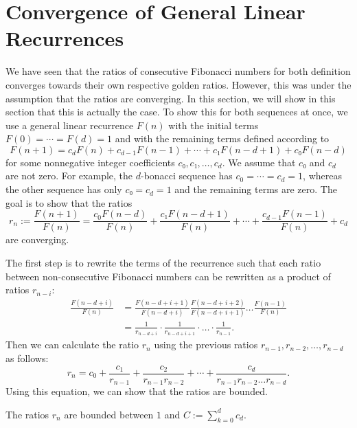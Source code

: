 \section{Convergence of General Linear Recurrences}
\label{sec:fib-conv}


We have seen that the ratios of consecutive Fibonacci numbers for both
definition converges towards their own respective golden ratios.
However, this was under the assumption that the ratios are converging.
In this section, we will show in this section that this is actually the case.
To show this for both sequences at once, we use a general linear recurrence $F(n)$
with the initial terms $F(0) = ⋯ = F(d) = 1$ and with the remaining terms
defined according to
\[
  F(n + 1) = c_d F(n) + c_{d-1} F(n-1) + ⋯ + c₁ F(n - d + 1) + c₀ F(n - d)
\]
for some nonnegative integer coefficients $c₀, c₁, …, c_d$.
We assume that $c₀$ and $c_d$ are not zero.
For example, the $d$-bonacci sequence has $c_0 = ⋯ = c_d = 1$,
whereas the other sequence has only $c₀ = c_d = 1$ and the remaining terms are zero.
The goal is to show that the ratios
\[
  r_n
  := \frac{F(n+1)}{F(n)}
  = \frac{c_0 F(n - d)}{F(n)} + \frac{c₁ F(n - d + 1)}{F(n)} + ⋯ + \frac{c_{d-1} F(n-1)}{F(n)} + c_d
\]
are converging.

The first step is to rewrite the terms of the recurrence such that each ratio
between non-consecutive Fibonacci numbers can be rewritten as a product of
ratios $r_{n-i}$:
\begin{align*}
  \frac{F(n - d + i)}{F(n)}
  & = \frac{F(n - d + i + 1)}{F(n - d + i)} \frac{F(n - d + i + 2)}{F(n - d + i + 1)} \dots \frac{F(n-1)}{F(n)} \\
  & = \frac{1}{r_{n - d + i}} · \frac{1}{r_{n - d + i + 1}} · \dots · \frac{1}{r_{n-1}}.
\end{align*}
Then we can calculate the ratio $r_n$ using the previous ratios $r_{n-1}, r_{n-2}, …, r_{n-d}$ as follows:
\[
  r_n = c_0 + \frac{c_1}{r_{n-1}} + \frac{c_2}{r_{n-1} r_{n-2}} + ⋯ + \frac{c_d}{r_{n-1} r_{n-2} \dots r_{n-d}}.
\]
Using this equation, we can show that the ratios are bounded.

\begin{lemma}
  \label{lem:fib-bounded}
  The ratios $r_n$ are bounded between $1$ and $C := ∑_{k=0}^d c_d$.
\end{lemma}

